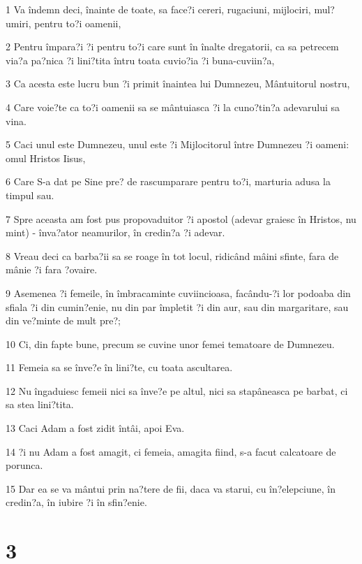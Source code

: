 \par 1 Va îndemn deci, înainte de toate, sa face?i cereri, rugaciuni, mijlociri, mul?umiri, pentru to?i oamenii,
\par 2 Pentru împara?i ?i pentru to?i care sunt în înalte dregatorii, ca sa petrecem via?a pa?nica ?i lini?tita întru toata cuvio?ia ?i buna-cuviin?a,
\par 3 Ca acesta este lucru bun ?i primit înaintea lui Dumnezeu, Mântuitorul nostru,
\par 4 Care voie?te ca to?i oamenii sa se mântuiasca ?i la cuno?tin?a adevarului sa vina.
\par 5 Caci unul este Dumnezeu, unul este ?i Mijlocitorul între Dumnezeu ?i oameni: omul Hristos Iisus,
\par 6 Care S-a dat pe Sine pre? de rascumparare pentru to?i, marturia adusa la timpul sau.
\par 7 Spre aceasta am fost pus propovaduitor ?i apostol (adevar graiesc în Hristos, nu mint) - înva?ator neamurilor, în credin?a ?i adevar.
\par 8 Vreau deci ca barba?ii sa se roage în tot locul, ridicând mâini sfinte, fara de mânie ?i fara ?ovaire.
\par 9 Asemenea ?i femeile, în îmbracaminte cuviincioasa, facându-?i lor podoaba din sfiala ?i din cumin?enie, nu din par împletit ?i din aur, sau din margaritare, sau din ve?minte de mult pre?;
\par 10 Ci, din fapte bune, precum se cuvine unor femei tematoare de Dumnezeu.
\par 11 Femeia sa se înve?e în lini?te, cu toata ascultarea.
\par 12 Nu îngaduiesc femeii nici sa înve?e pe altul, nici sa stapâneasca pe barbat, ci sa stea lini?tita.
\par 13 Caci Adam a fost zidit întâi, apoi Eva.
\par 14 ?i nu Adam a fost amagit, ci femeia, amagita fiind, s-a facut calcatoare de porunca.
\par 15 Dar ea se va mântui prin na?tere de fii, daca va starui, cu în?elepciune, în credin?a, în iubire ?i în sfin?enie.

\chapter{3}

